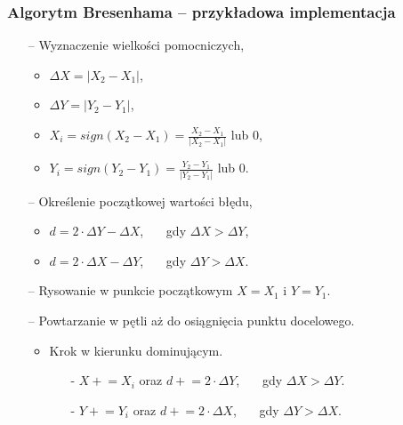 \documentclass[usenames,dvipsnames,aspectratio=43,presentation]{beamer}
\begin{document}
    \begin{frame}
        \frametitle{Algorytm Bresenhama – przykładowa implementacja}
        \footnotesize
        
        \begin{itemize}
            \setlength{\itemsep}{0.25em}
            \item[--] Wyznaczenie wielkości pomocniczych,
                      \begin{itemize}
                          \setlength{\itemsep}{0.25em}
                          \scriptsize
                          \item $\Delta{X} = |X_2 - X_1|$,
                          \item $\Delta{Y} = |Y_2 - Y_1|$,
                          \item $X_i = sign(X_2 - X_1) = \frac{X_2 - X_1}{|X_2 - X_1|}$ lub 0,
                          \item $Y_i = sign(Y_2 - Y_1) = \frac{Y_2 - Y_1}{|Y_2 - Y_1|}$ lub 0.
                      \end{itemize}
            \item[--] Określenie początkowej wartości błędu,
                      \begin{itemize}
                          \setlength{\itemsep}{0.25em}
                          \scriptsize
                          \item $d = 2 \cdot \Delta{Y} - \Delta{X}$, ~~~gdy $\Delta{X} > \Delta{Y}$,
                          \item $d = 2 \cdot \Delta{X} - \Delta{Y}$, ~~~gdy $\Delta{Y} > \Delta{X}$.
                      \end{itemize}
            \item[--] Rysowanie w punkcie początkowym $X = X_1$ i $Y = Y_1$.
            \item[--] Powtarzanie w pętli aż do osiągnięcia punktu docelowego.
                      \begin{itemize}
                          \setlength{\itemsep}{0.1em}
                          \scriptsize
                          \item Krok w kierunku dominującym.
                                \begin{itemize}
                                    \scriptsize
                                    \item[-] $X \mathrel{+}= X_i$ oraz $d \mathrel{+}= 2 \cdot \Delta{Y}$, ~~~gdy $\Delta{X} > \Delta{Y}$.
                                    \item[-] $Y \mathrel{+}= Y_i$ oraz $d \mathrel{+}= 2 \cdot \Delta{X}$, ~~~gdy $\Delta{Y} > \Delta{X}$.

\end{itemize}
\end{itemize}
\end{itemize}
\end{frame}
\end{document}
